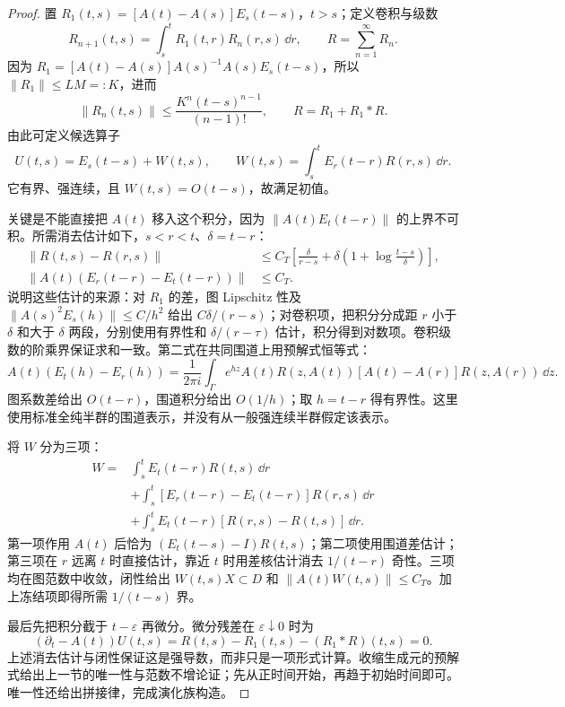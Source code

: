 \begin{proof}
置 $R_1(t,s)=[A(t)-A(s)]E_s(t-s)$，$t>s$；定义卷积与级数
\[
 R_{n+1}(t,s)=\int_s^tR_1(t,r)R_n(r,s)\,\dd r,
 \qquad R=\sum_{n=1}^\infty R_n.
\]
因为 $R_1=[A(t)-A(s)]A(s)^{-1}A(s)E_s(t-s)$，所以 $\|R_1\|\le LM=:K$，进而
\[
 \|R_n(t,s)\|\le\frac{K^n(t-s)^{n-1}}{(n-1)!},\qquad
 R=R_1+R_1*R.
\]
由此可定义候选算子
\begin{equation}\label{eq:y14-parametrix}
 U(t,s)=E_s(t-s)+W(t,s),\qquad
 W(t,s)=\int_s^tE_r(t-r)R(r,s)\,\dd r.
\end{equation}
它有界、强连续，且 $W(t,s)=O(t-s)$，故满足初值。

关键是不能直接把 $A(t)$ 移入这个积分，因为 $\|A(t)E_t(t-r)\|$ 的上界不可积。所需消去估计如下，$s<r<t$、$\delta=t-r$：
\begin{align*}
 \|R(t,s)-R(r,s)\|&\le C_T\left[\frac\delta{r-s}+\delta\left(1+\log\frac{t-s}{\delta}\right)\right],\\
 \|A(t)(E_r(t-r)-E_t(t-r))\|&\le C_T.
\end{align*}
说明这些估计的来源：对 $R_1$ 的差，图 Lipschitz 性及 $\|A(s)^2E_s(h)\|\le C/h^2$ 给出 $C\delta/(r-s)$；对卷积项，把积分分成距 $r$ 小于 $\delta$ 和大于 $\delta$ 两段，分别使用有界性和 $\delta/(r-\tau)$ 估计，积分得到对数项。卷积级数的阶乘界保证求和一致。第二式在共同围道上用预解式恒等式：
\[
 A(t)(E_t(h)-E_r(h))=
 \frac1{2\pi i}\int_\Gamma e^{hz}A(t)R(z,A(t))
 [A(t)-A(r)]R(z,A(r))\,\dd z.
\]
图系数差给出 $O(t-r)$，围道积分给出 $O(1/h)$；取 $h=t-r$ 得有界性。这里使用标准全纯半群的围道表示，并没有从一般强连续半群假定该表示。

将 $W$ 分为三项：
\begin{align*}
 W={}&\int_s^tE_t(t-r)R(t,s)\,\dd r\\
 &+\int_s^t[E_r(t-r)-E_t(t-r)]R(r,s)\,\dd r\\
 &+\int_s^tE_t(t-r)[R(r,s)-R(t,s)]\,\dd r.
\end{align*}
第一项作用 $A(t)$ 后恰为 $(E_t(t-s)-I)R(t,s)$；第二项使用围道差估计；第三项在 $r$ 远离 $t$ 时直接估计，靠近 $t$ 时用差核估计消去 $1/(t-r)$ 奇性。三项均在图范数中收敛，闭性给出 $W(t,s)X\subset D$ 和 $\|A(t)W(t,s)\|\le C_T$。加上冻结项即得所需 $1/(t-s)$ 界。

最后先把积分截于 $t-\varepsilon$ 再微分。微分残差在 $\varepsilon\downarrow0$ 时为
\[
 (\partial_t-A(t))U(t,s)=R(t,s)-R_1(t,s)-(R_1*R)(t,s)=0.
\]
上述消去估计与闭性保证这是强导数，而非只是一项形式计算。收缩生成元的预解式给出上一节的唯一性与范数不增论证；先从正时间开始，再趋于初始时间即可。唯一性还给出拼接律，完成演化族构造。
\end{proof}

